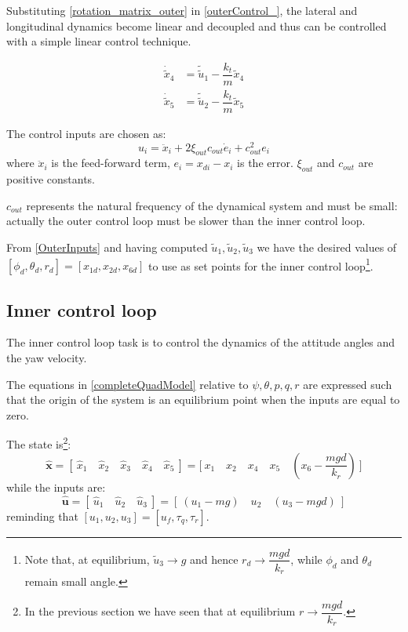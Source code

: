 \documentclass[11pt,a4paper]{scrartcl}
\begin{document}
Substituting \eqref{rotation_matrix_outer} in \eqref{outerControl_}, the lateral and longitudinal dynamics become linear and decoupled and thus can be controlled with a simple linear control technique.

\begin{subequations}
	\begin{align}
		\dot{\tilde{x}}_4 & = \tilde{\tilde{u}}_1 - \dfrac{k_t}{m} \tilde{x}_4 \\
		\dot{\tilde{x}}_5 & = \tilde{\tilde{u}}_2 - \dfrac{k_t}{m} \tilde{x}_5
	\end{align}
\end{subequations}

The control inputs are chosen as:
\begin{equation}
	u_i = \ddot{x}_i + 2\xi_{out}c_{out} \dot{e}_i + c_{out}^2 e_i 
\end{equation}
where $ \ddot{x}_i $ is the feed-forward term, $ e_i = x_{di} - x_i $ is the error. $ \xi_{out} $ and $ c_{out} $ are positive constants. 

$ c_{out} $ represents the natural frequency of the dynamical system and must be small: actually the outer control loop must be slower than the inner control loop. 

From \eqref{OuterInputs} and having computed $ \tilde{u}_1, \tilde{u}_2, \tilde{u}_3 $ we have the desired values of $ [\phi_d, \theta_d, r_d]=[x_{1d}, x_{2d}, x_{6d}] $ to use as set points for the inner control loop\footnote{Note that, at equilibrium, $ \tilde{u}_3 \rightarrow g $ and hence $ r_d \rightarrow \dfrac{mgd}{k_r} $, while $ \phi_d $ and $ \theta_d $ remain small angle.}. 


\subsection{Inner control loop}

The inner control loop task is to control the dynamics of the attitude angles and the yaw velocity.

The equations in \eqref{completeQuadModel} relative to $ \psi, \theta, p, q, r $ are expressed such that the origin of the system is an equilibrium point when the inputs are equal to zero.

The state is\footnote{In the previous section we have seen that at equilibrium $ r \rightarrow \dfrac{mgd}{k_r} $. }:
\begin{equation}
	\mathbf{\hat{x}} = [ \ \hat{x}_1 \quad \hat{x}_2 \quad \hat{x}_3 \quad \hat{x}_4 \quad \hat{x}_5 \ ] = \Big[ \  x_1 \quad x_2 \quad x_4 \quad x_5 \quad (x_6-\dfrac{mgd}{k_r}) \ \Big]	
\end{equation}
while the inputs are:
\begin{equation}
	\mathbf{\hat{u}} = [ \ \hat{u}_1 \quad \hat{u}_2 \quad \hat{u}_3 \ ] = [ \ (u_1 -mg) \quad u_2 \quad (u_3 - mgd) \ ]
\end{equation}
reminding that $ [u_1, u_2, u_3] = [u_f, \tau_q, \tau_r ]  $.
\end{document}
